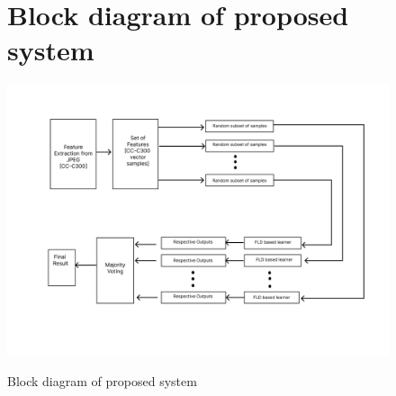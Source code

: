 \begin{figure}[H]
\section{Block diagram of proposed system}
 \centering
\includegraphics[width=140mm]{./img/model.png}\\
\caption{ Block diagram of proposed system}
\end{figure}
\clearpage

